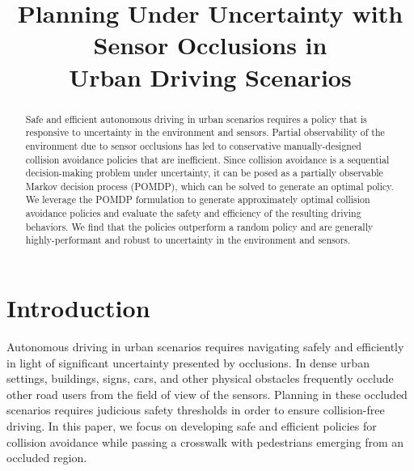 \documentclass[conference]{IEEEtran}
\begin{document}
\title{\LARGE \textbf{Planning Under Uncertainty with Sensor Occlusions in \\ Urban Driving Scenarios} %
}


\author{
} %


\maketitle

\begin{abstract}
    Safe and efficient autonomous driving in urban scenarios requires a policy that is responsive to uncertainty in the environment and sensors. Partial observability of the environment due to sensor occlusions has led to conservative manually-designed collision avoidance policies that are inefficient. Since collision avoidance is a sequential decision-making problem under uncertainty, it can be posed as a partially observable Markov decision process (POMDP), which can be solved to generate an optimal policy. We leverage the POMDP formulation to generate approximately optimal collision avoidance policies and evaluate the safety and efficiency of the resulting driving behaviors. We find that the policies outperform a random policy and are generally highly-performant and robust to uncertainty in the environment and sensors.
\end{abstract}


\section{Introduction}
\label{sec:introduction}

Autonomous driving in urban scenarios requires navigating safely and efficiently in light of significant uncertainty presented by occlusions. In dense urban settings, buildings, signs, cars, and other physical obstacles frequently occlude other road users from the field of view of the sensors. Planning in these occluded scenarios requires judicious safety thresholds in order to ensure collision-free driving. In this paper, we focus on developing safe and efficient policies for collision avoidance while passing a crosswalk with pedestrians emerging from an occluded region.
\end{document}
